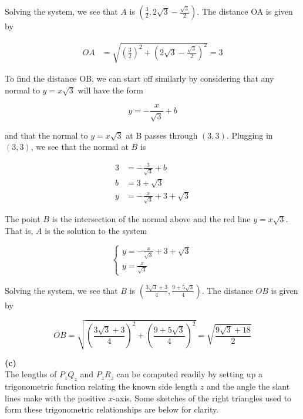 \documentclass{article}
\begin{document}
    Solving the system, we see that $A$ is $\left(\frac{3}{2},2\sqrt{3}-\frac{\sqrt{3}}{2}\right)$. The distance OA is given by

    \begin{align*}
        OA  &= \sqrt{\left(\frac{3}{2}\right)^2 + \left(2\sqrt{3}-\frac{\sqrt{3}}{2}\right)^2} = 3
    \end{align*}

    To find the distance OB, we can start off similarly by considering that any normal to $y=x\sqrt{3}$ will have the form

    \[
        y = -\frac{x}{\sqrt{3}}+b
    \]

    and that the normal to $y=x\sqrt{3}$ at B passes through $(3,3)$. Plugging in $(3,3)$, we see that the normal at $B$ is

    \begin{align*}
        3   &= -\frac{3}{\sqrt{3}}+b \\
        b   &= 3 + \sqrt{3} \\
        y   &= -\frac{x}{\sqrt{3}}+3+\sqrt{3}
    \end{align*}

    The point $B$ is the intersection of the normal above and the red line $y=x\sqrt{3}$. That is, $A$ is the solution to the system

    \[
        \begin{cases}
            y = -\frac{x}{\sqrt{3}}+3+\sqrt{3} \\
            y = \frac{x}{\sqrt{3}}
        \end{cases}
    \]

    Solving the system, we see that $B$ is $\left(\frac{3\sqrt{3}+3}{4},\frac{9+5\sqrt{3}}{4}\right)$. The distance $OB$ is given by

    \[
        OB = \sqrt{\left(\frac{3\sqrt{3}+3}{4}\right)^2+\left(\frac{9+5\sqrt{3}}{4}\right)^2} = \sqrt{\frac{9\sqrt{3}+18}{2}}
    \]

    \textbf{(c)} \\
    The lengths of $P_z Q_z$ and $P_z R_z$ can be computed readily by setting up a trigonometric function relating the known side length $z$ and the angle the slant lines make with the positive $x$-axis. Some sketches
    of the right triangles used to form these trigonometric relationships are below for clarity. \\
\end{document}
